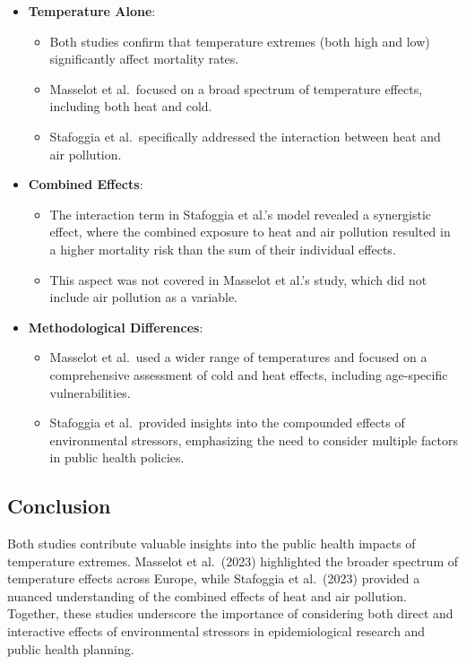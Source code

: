 \documentclass[
]{krantz}
\providecommand{\tightlist}{%
  \setlength{\itemsep}{0pt}\setlength{\parskip}{0pt}}
\begin{document}
\begin{itemize}
\tightlist
\item
  \textbf{Temperature Alone}:

  \begin{itemize}
  \tightlist
  \item
    Both studies confirm that temperature extremes (both high and low) significantly affect mortality rates.
  \item
    Masselot et al.~focused on a broad spectrum of temperature effects, including both heat and cold.
  \item
    Stafoggia et al.~specifically addressed the interaction between heat and air pollution.
  \end{itemize}
\item
  \textbf{Combined Effects}:

  \begin{itemize}
  \tightlist
  \item
    The interaction term in Stafoggia et al.'s model revealed a synergistic effect, where the combined exposure to heat and air pollution resulted in a higher mortality risk than the sum of their individual effects.
  \item
    This aspect was not covered in Masselot et al.'s study, which did not include air pollution as a variable.
  \end{itemize}
\item
  \textbf{Methodological Differences}:

  \begin{itemize}
  \tightlist
  \item
    Masselot et al.~used a wider range of temperatures and focused on a comprehensive assessment of cold and heat effects, including age-specific vulnerabilities.
  \item
    Stafoggia et al.~provided insights into the compounded effects of environmental stressors, emphasizing the need to consider multiple factors in public health policies.
  \end{itemize}
\end{itemize}

\subsection{Conclusion}\label{conclusion-5}

Both studies contribute valuable insights into the public health impacts of temperature extremes. Masselot et al.~(2023) \citep{masselot2023} highlighted the broader spectrum of temperature effects across Europe, while Stafoggia et al.~(2023) \citep{stafoggia2023} provided a nuanced understanding of the combined effects of heat and air pollution. Together, these studies underscore the importance of considering both direct and interactive effects of environmental stressors in epidemiological research and public health planning.
\end{document}
